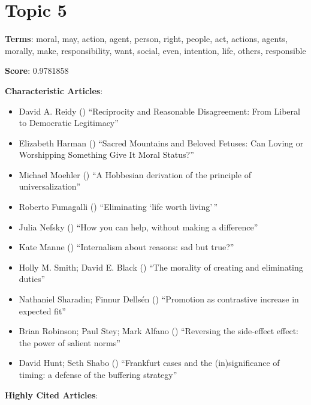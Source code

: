 \documentclass[
  10pt,
  letterpaper,
  DIV=11,
  numbers=noendperiod,
  twoside]{scrartcl}
\providecommand{\tightlist}{%
  \setlength{\itemsep}{0pt}\setlength{\parskip}{0pt}}\usepackage{longtable,booktabs,array}
\begin{document}
\section{Topic 5}\label{topic-5}

\textbf{Terms}: moral, may, action, agent, person, right, people, act,
actions, agents, morally, make, responsibility, want, social, even,
intention, life, others, responsible

\textbf{Score}: 0.9781858

\textbf{Characteristic Articles}:

\begin{itemize}
\tightlist
\item
  David A. Reidy () ``Reciprocity
  and Reasonable Disagreement: From Liberal to Democratic Legitimacy''
\item
  Elizabeth Harman () ``Sacred
  Mountains and Beloved Fetuses: Can Loving or Worshipping Something
  Give It Moral Status?''
\item
  Michael Moehler () ``A
  Hobbesian derivation of the principle of universalization''
\item
  Roberto Fumagalli ()
  ``Eliminating `life worth living'\,''
\item
  Julia Nefsky () ``How you can
  help, without making a difference''
\item
  Kate Manne () ``Internalism
  about reasons: sad but true?''
\item
  Holly M. Smith; David E. Black
  () ``The morality of creating
  and eliminating duties''
\item
  Nathaniel Sharadin; Finnur Dellsén
  () ``Promotion as contrastive
  increase in expected fit''
\item
  Brian Robinson; Paul Stey; Mark Alfano
  () ``Reversing the side-effect
  effect: the power of salient norms''
\item
  David Hunt; Seth Shabo ()
  ``Frankfurt cases and the (in)significance of timing: a defense of the
  buffering strategy''
\end{itemize}

\textbf{Highly Cited Articles}:
\end{document}
